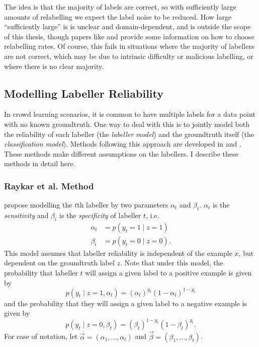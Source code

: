         The idea is that the majority of labels are correct, so with sufficiently large amounts of relabelling we expect the label noise to be reduced. How large ``sufficiently large'' is is unclear and domain-dependent, and is outside the scope of this thesis, though papers like \citet{sheng08} and \citet{lin16} provide some information on how to choose relabelling rates. Of course, this fails in situations where the majority of labellers are not correct, which may be due to intrinsic difficulty or malicious labelling, or where there is no clear majority.

    \subsection{Modelling Labeller Reliability}

        In crowd learning scenarios, it is common to have multiple labels for a data point with no known groundtruth. One way to deal with this is to jointly model both the reliability of each labeller (the \emph{labeller model}) and the groundtruth itself (the \emph{classification model}). Methods following this approach are developed in \citet{raykar10} and \citet{yan10}. These methods make different assumptions on the labellers. I describe these methods in detail here.

        \subsubsection{Raykar et al. Method}
            \label{sec:raykar}

            \citet{raykar10} propose modelling the $t$th labeller by two parameters $\alpha_t$ and $\beta_t$. $\alpha_t$ is the \emph{sensitivity} and $\beta_t$ is the \emph{specificity} of labeller $t$, i.e.
            \begin{align*}
                \alpha_t &= p(y_t = 1 \mid z = 1)\\
                \beta_t &= p(y_t = 0 \mid z = 0).
            \end{align*}
            This model assumes that labeller reliability is independent of the example $x$, but dependent on the groundtruth label $z$. Note that under this model, the probability that labeller $t$ will assign a given label to a positive example is given by
            \begin{equation*}
                p(y_t \mid z = 1, \alpha_t) = (\alpha_t)^{y_t} (1 - \alpha_t)^{1 - y_t}
            \end{equation*}
            and the probability that they will assign a given label to a negative example is given by
            \begin{equation*}
                p(y_t \mid z = 0, \beta_t) = (\beta_t)^{1 - y_t} (1 - \beta_t)^{y_t}.
            \end{equation*}
            For ease of notation, let $\vec \alpha = (\alpha_1, \dots, \alpha_t)$ and $\vec \beta = (\beta_1, \dots, \beta_t)$.

